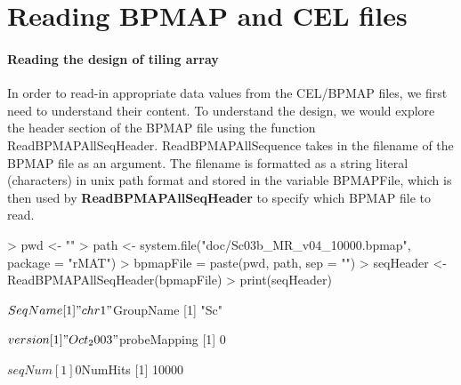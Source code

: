 \documentclass[11pt]{article}
\begin{document}
\part{Reading BPMAP and CEL files}

\subsection*{Reading the design of tiling array}

In order to read-in appropriate data values from the CEL/BPMAP files, we first need to understand their content. To understand the design, we would explore the header section of the BPMAP file using the function ReadBPMAPAllSeqHeader. ReadBPMAPAllSequence takes in the filename of the BPMAP file as an argument. The filename is formatted as a string literal (characters) in unix path format and stored in the variable BPMAPFile, which is then used by \textbf{ReadBPMAPAllSeqHeader} to specify which BPMAP file to read. 

\begin{Schunk}
\begin{Sinput}
> pwd <- ""
> path <- system.file("doc/Sc03b_MR_v04_10000.bpmap", package = "rMAT")
> bpmapFile = paste(pwd, path, sep = "")
> seqHeader <- ReadBPMAPAllSeqHeader(bpmapFile)
> print(seqHeader)
\end{Sinput}
\begin{Soutput}
$SeqName
[1] "chr1"

$GroupName
[1] "Sc"

$version
[1] "Oct_2003"

$probeMapping
[1] 0

$seqNum
[1] 0

$NumHits
[1] 10000
\end{Soutput}
\end{Schunk}
\end{document}
